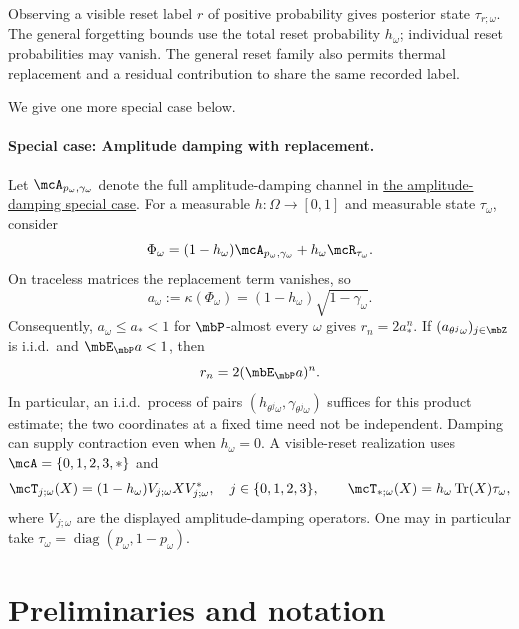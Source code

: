 \documentclass[a4paper]{article}
\numberwithin{equation}{section}   %
\theoremstyle{plain}   %
\theoremstyle{plain}   %
\theoremstyle{examplestyle}
\DeclareMathOperator{\pr}{\mbP}           %
\begin{document}
    Observing a visible reset label $r$ of positive probability gives posterior state $\tau_{r;\omega}$.
    The general forgetting bounds use the total reset probability $h_\omega$; individual reset probabilities may vanish.
    The general reset family also permits thermal replacement and a residual contribution to share the same recorded label.

    We give one more special case below. 

    \paragraph{Special case: Amplitude damping with replacement.}
    \label{par:amplitude-damping-replacement}
        Let $\mcA_{p_\omega,\gamma_\omega}$ denote the full amplitude-damping channel in \hyperref[par:amplitude-damping]{the amplitude-damping special case}.
        For a measurable $h:\Omega\to[0,1]$ and measurable state
            $\tau_\omega$, consider
            \[
             \Phi_\omega
             =(1-h_\omega)\mcA_{p_\omega,\gamma_\omega}
                   +h_\omega\mcR_{\tau_\omega}.
        \]
        On traceless matrices the replacement term vanishes, so
        \[
             a_\omega:=\kappa(\Phi_\omega)
             =(1-h_\omega)\sqrt{1-\gamma_\omega}.
        \]
        Consequently, $a_\omega\le a_*<1$ for $\pr$-almost every $\omega$ gives $r_n=2a_*^n$.
        If $(a_{\theta^j\omega})_{j\in\mbZ}$ is i.i.d.\ and $\mbE_{\pr}a<1$, then
        \[
            r_n=2(\mbE_{\pr}a)^n.
        \]
        In particular, an i.i.d.\ process of pairs $(h_{\theta^j\omega},\gamma_{\theta^j\omega})$ suffices for this product estimate; the two coordinates at a fixed time need not be independent.
        Damping can supply contraction even when $h_\omega=0$.
        A visible-reset realization uses $\mcA=\{0,1,2,3,*\}$ and
        \[
             \mcT_{j;\omega}(X)
             =(1-h_\omega)V_{j;\omega}XV_{j;\omega}^*,
             \quad j\in\{0,1,2,3\},
             \qquad
             \mcT_{*;\omega}(X)
             =h_\omega\operatorname{Tr}(X)\tau_\omega,
        \]
        where $V_{j;\omega}$ are the displayed amplitude-damping operators. 
        One may in particular take $\tau_\omega=\operatorname{diag}(p_\omega,1-p_\omega)$.


\section{Preliminaries and notation}
\label{section:proof_first}
\end{document}
